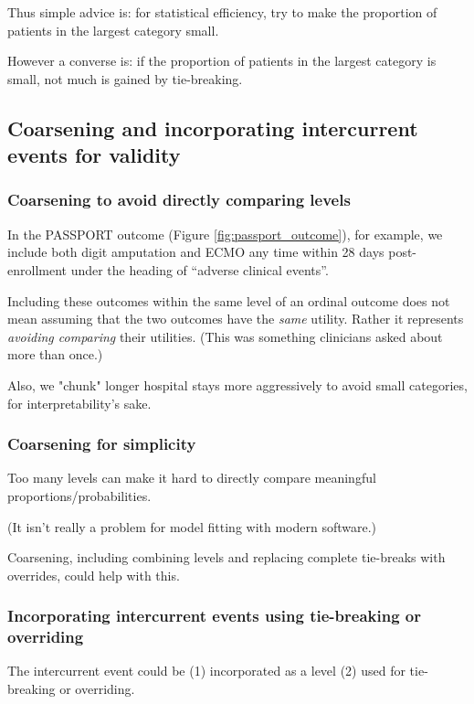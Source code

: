 \documentclass[
  11pt,
  fleqn
]{article}
\begin{document}
Thus simple advice is: for statistical efficiency, try to make the proportion
of patients in the largest category small.

However a converse is: if the proportion of patients in the largest category is
small, not much is gained by tie-breaking.

\subsection{Coarsening and incorporating intercurrent events for validity}

\subsubsection{Coarsening to avoid directly comparing levels}

In the PASSPORT outcome (Figure \ref{fig:passport_outcome}), for
example, we include both digit
amputation and ECMO
any time within 28 days post-enrollment under the heading of
``adverse clinical events''.

Including these outcomes within the same level of an
ordinal outcome does not mean assuming that the two outcomes have the
\emph{same} utility. Rather it represents \emph{avoiding comparing}
their utilities. (This was something clinicians asked about more than once.)

Also, we "chunk" longer hospital stays more aggressively to avoid
small categories, for interpretability's sake.

\subsubsection{Coarsening for simplicity}

Too many levels can make it hard to directly compare meaningful
proportions/probabilities.

(It isn't really a problem for model fitting with modern software.)

Coarsening, including combining levels and replacing complete
tie-breaks with overrides, could help with this.

\subsubsection{Incorporating intercurrent events using tie-breaking
or overriding}

The intercurrent event could be (1) incorporated as a level (2) used
for tie-breaking or overriding.
\end{document}
